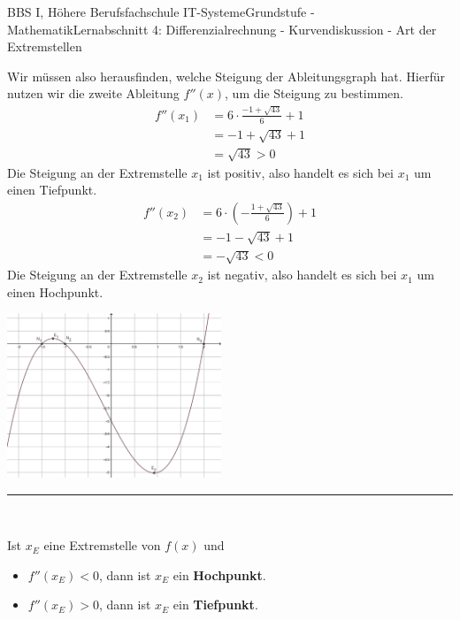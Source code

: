 \documentclass[11pt,twocolumn,oneside,openany,headings=optiontotoc,11pt,numbers=noenddot]{article}
\begin{document}
\begin{worksheet}{BBS I, Höhere Berufsfachschule IT-Systeme}{Grundstufe - Mathematik}{Lernabschnitt 4: Differenzialrechnung - Kurvendiskussion - Art der Extremstellen}
		\par\noindent
		Wir müssen also herausfinden, welche Steigung der Ableitungsgraph hat. Hierfür nutzen wir die zweite Ableitung \(f''(x)\), um die Steigung zu bestimmen.\\
		\begin{align*}
			f''(x_1) & = 6\cdot{}\frac{-1+\sqrt{43}}{6} + 1\\
			& = -1+\sqrt{43} + 1\\
			& = \sqrt{43} > 0
		\end{align*}
		Die Steigung an der Extremstelle \(x_1\) ist positiv, also handelt es sich bei \(x_1\) um einen Tiefpunkt.
		\begin{align*}
			f''(x_2) & = 6\cdot{}\left(-\frac{1+\sqrt{43}}{6}\right) + 1\\
			& = - 1 - \sqrt{43} + 1\\
			& = -\sqrt{43} < 0
		\end{align*}
		Die Steigung an der Extremstelle \(x_2\) ist negativ, also handelt es sich bei \(x_1\) um einen Hochpunkt.\\
		\par\noindent
		\includegraphics[width=0.48\textwidth]{../99_Bilder/042_Bsp.png}\\
		\rule{0.48\textwidth}{0.1pt}\\
		\par\noindent
		Ist \(x_E\) eine Extremstelle von \(f(x)\) und
		\begin{itemize}[label=-]
			\item \(f''(x_E) < 0\), dann ist \(x_E\) ein \textbf{Hochpunkt}.\\
			\item \(f''(x_E) > 0\), dann ist \(x_E\) ein \textbf{Tiefpunkt}.
		\end{itemize}
	\end{worksheet}
\end{document}

